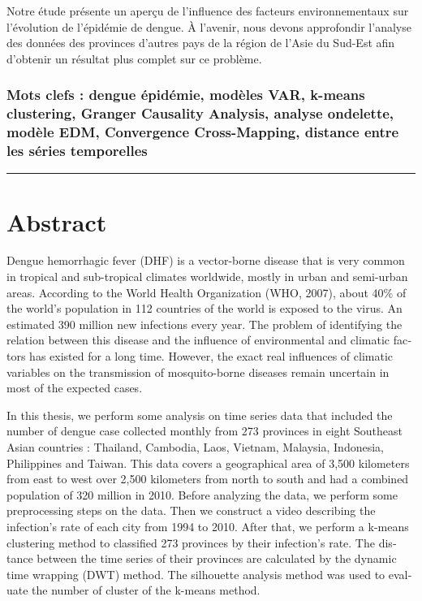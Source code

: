 Notre étude présente un aperçu de l’influence des facteurs environnementaux sur l’évolution de l’épidémie de dengue. À l'avenir, nous devons approfondir l'analyse des données des provinces d'autres pays de la région de l'Asie du Sud-Est afin d'obtenir un résultat plus complet sur ce problème.
\subsubsection*{Mots clefs : dengue épidémie, modèles VAR, k-means clustering, Granger Causality Analysis, analyse ondelette, modèle EDM, Convergence Cross-Mapping, distance entre les séries temporelles}



\begin{otherlanguage}{english}

\vspace{1cm}
\begin{center} \rule{\textwidth/3}{1pt} \end{center}
\vspace{1cm}

\section*{Abstract}
Dengue hemorrhagic fever (DHF) is a vector-borne disease that is very common in tropical and sub-tropical climates worldwide, mostly in urban and semi-urban areas. According to the World Health Organization (WHO, 2007), about 40\% of the world's population in 112 countries of the world is exposed to the virus. An estimated 390 million new infections every year. The problem of identifying the relation between this disease and the influence of environmental and climatic factors has existed for a long time. However, the exact real influences of climatic variables on the transmission of mosquito-borne diseases remain uncertain in most of the expected cases.

In this thesis, we perform some analysis on time series data that included the number of dengue case collected monthly from 273 provinces in eight Southeast Asian countries : Thailand, Cambodia, Laos, Vietnam, Malaysia, Indonesia, Philippines and Taiwan. This data covers a geographical area of 3,500 kilometers from east to west over 2,500 kilometers from north to south and had a combined population of 320 million in 2010. Before analyzing the data, we perform some preprocessing steps on the data. Then we construct a video describing the infection's rate of each city from 1994 to 2010. After that, we perform a k-means clustering method to classified 273 provinces by their infection's rate. The distance between the time series of their provinces are calculated by the dynamic time wrapping (DWT) method. The silhouette analysis method was used to evaluate the number of cluster of the k-means method.


\end{otherlanguage}
